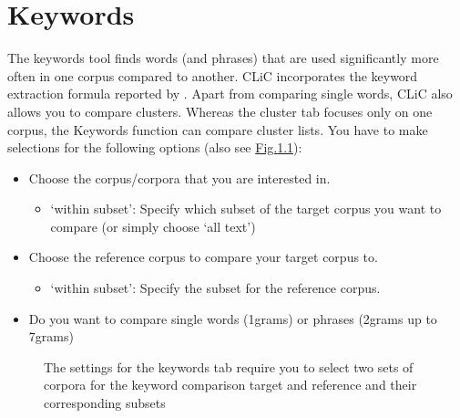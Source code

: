 \documentclass[letterpaper,10pt,english]{sphinxmanual}
\begin{document}
\chapter{Keywords}
\label{\detokenize{clicanalysis/keywords:keywords}}\label{\detokenize{clicanalysis/keywords:id1}}\label{\detokenize{clicanalysis/keywords::doc}}
\sphinxAtStartPar
The keywords tool finds words (and phrases) that are used significantly
more often in one corpus compared to another. CLiC incorporates the
keyword extraction formula reported by . Apart
from comparing single words, CLiC also allows you to compare clusters.
Whereas the cluster tab focuses only on one corpus, the Keywords
function can compare cluster lists. You have to make selections for the
following options (also see
\hyperref[\detokenize{clicanalysis/keywords:figure-analysis-keywords-settings}]{Fig.\@ \ref{\detokenize{clicanalysis/keywords:figure-analysis-keywords-settings}}}):
\begin{itemize}
\item {} 
\sphinxAtStartPar
{} Choose the corpus/corpora that you are
interested in.
\begin{itemize}
\item {} 
\sphinxAtStartPar
‘within subset’: Specify which subset of the target corpus you
want to compare (or simply choose ‘all text’)

\end{itemize}

\item {} 
\sphinxAtStartPar
{} Choose the reference corpus to compare your
target corpus to.
\begin{itemize}
\item {} 
\sphinxAtStartPar
‘within subset’: Specify the subset for the reference corpus.

\end{itemize}

\item {} 
\sphinxAtStartPar
{} Do you want to compare single words (1\sphinxhyphen{}grams) or
phrases (2\sphinxhyphen{}grams up to 7\sphinxhyphen{}grams)

\end{itemize}

\begin{figure}[htbp]
\centering
\capstart

\noindent{}
\caption{The settings for the keywords tab require you to select
two sets of corpora for the keyword comparison \textendash{} target and reference
\textendash{} and their corresponding subsets}\label{\detokenize{clicanalysis/keywords:id4}}\label{\detokenize{clicanalysis/keywords:figure-analysis-keywords-settings}}\end{figure}
\end{document}
